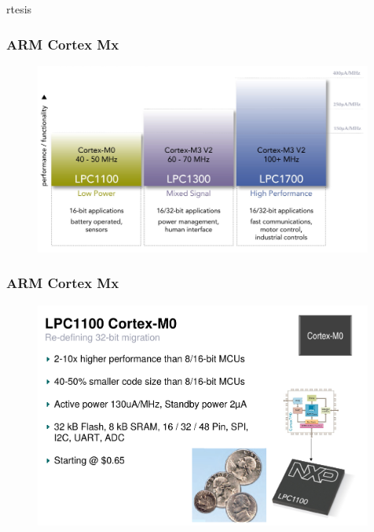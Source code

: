 \documentclass{beamer}
\begin{document}
\begin{frame} rtesis
\frametitle{ARM Cortex Mx}
\begin{figure}[h] \begin{center}
\includegraphics[width=0.99\textwidth]{figures/arm-cortex2.png}
\end{center} \end{figure}
\end{frame}

\begin{frame} 
\frametitle{ARM Cortex Mx}
\begin{figure}[h] \begin{center}
\includegraphics[width=0.99\textwidth]{figures/arm-cortex3.png}
\end{center} \end{figure}
\end{frame}
\end{document}
